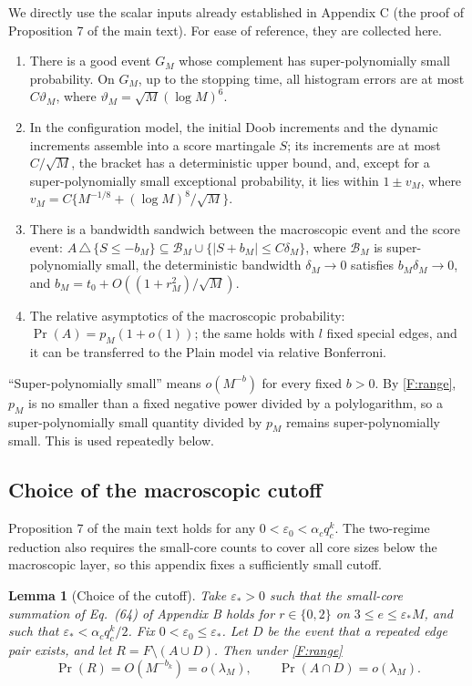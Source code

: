 \documentclass[a4paper,11pt]{article}
\newtheorem{lemma}[theorem]{Lemma}
\numberwithin{equation}{section}
\begin{document}
We directly use the scalar inputs already established in Appendix C (the proof of Proposition 7 of the main
text). For ease of reference, they are collected here.

\begin{enumerate}[label=(C\arabic*)]
\item There is a good event $G_M$ whose complement has super-polynomially small probability. On $G_M$, up to
the stopping time, all histogram errors are at most $C\vartheta_M$, where
$\vartheta_M=\sqrt M(\log M)^6$.
\item In the configuration model, the initial Doob increments and the dynamic increments assemble into a score
martingale $S$; its increments are at most $C/\sqrt M$, the bracket has a deterministic upper bound, and,
except for a super-polynomially small exceptional probability, it lies within $1\pm v_M$, where
$v_M=C\{M^{-1/8}+(\log M)^8/\sqrt M\}$.
\item There is a bandwidth sandwich between the macroscopic event and the score event:
$A\,\triangle\,\{S\le-b_M\}\subseteq\mathcal B_M\cup\{|S+b_M|\le C\delta_M\}$,
where $\mathcal B_M$ is super-polynomially small, the deterministic bandwidth $\delta_M\to0$ satisfies
$b_M\delta_M\to0$, and $b_M=t_0+O((1+r_M^2)/\sqrt M)$.
\item The relative asymptotics of the macroscopic probability: $\Pr(A)=p_M(1+o(1))$; the same holds with $l$
fixed special edges, and it can be transferred to the Plain model via relative Bonferroni.
\end{enumerate}

``Super-polynomially small'' means $o(M^{-b})$ for every fixed $b>0$. By \eqref{F:range}, $p_M$ is no smaller
than a fixed negative power divided by a polylogarithm, so a super-polynomially small quantity divided by $p_M$
remains super-polynomially small. This is used repeatedly below.

\subsection{Choice of the macroscopic cutoff}

Proposition 7 of the main text holds for any $0<\varepsilon_0<\alpha_cq_c^k$. The two-regime reduction also
requires the small-core counts to cover all core sizes below the macroscopic layer, so this appendix fixes a
sufficiently small cutoff.

\begin{lemma}[Choice of the cutoff]\label{F:lem:cutoff}
Take $\varepsilon_*>0$ such that the small-core summation of Eq.~(64) of Appendix B holds for $r\in\{0,2\}$ on
$3\le e\le\varepsilon_*M$, and such that $\varepsilon_*<\alpha_cq_c^k/2$. Fix $0<\varepsilon_0\le\varepsilon_*$.
Let $D$ be the event that a repeated edge pair exists, and let $R=F\setminus(A\cup D)$. Then under
\eqref{F:range}
\begin{equation}
\Pr(R)=O(M^{-b_k})=o(\lambda_M),\qquad \Pr(A\cap D)=o(\lambda_M).\label{F:cutoff}
\end{equation}
\end{lemma}
\end{document}
